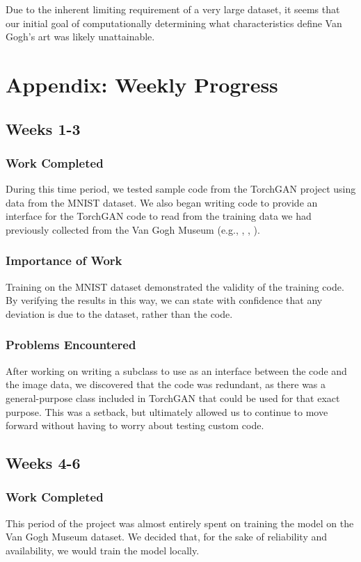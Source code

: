 \documentclass[11pt,letterpaper]{article}
\begin{document}
		Due to the inherent limiting requirement of a very large dataset, it seems that our initial goal of computationally determining what characteristics define Van Gogh's art was likely unattainable.

\appendix
	\section{Appendix: Weekly Progress}
		\subsection{Weeks 1-3}
		\label{subsec:weekly:1-3}
			\subsubsection{Work Completed}
				During this time period, we tested sample code from the TorchGAN\cite{pal2019torchgan} project using data from the MNIST\cite{lecun2010mnist} dataset.
				We also began writing code to provide an interface for the TorchGAN code to read from the training data we had previously collected from the Van Gogh Museum (e.g., \cite{001}, \cite{002}, \cite{003}).
			\subsubsection{Importance of Work}
				Training on the MNIST dataset demonstrated the validity of the training code.
				By verifying the results in this way, we can state with confidence that any deviation is due to the dataset, rather than the code.
			\subsubsection{Problems Encountered}
				After working on writing a subclass to use as an interface between the code and the image data, we discovered that the code was redundant, as there was a general-purpose class included in TorchGAN that could be used for that exact purpose.
				This was a setback, but ultimately allowed us to continue to move forward without having to worry about testing custom code.

		\subsection{Weeks 4-6}
			\subsubsection{Work Completed}
				This period of the project was almost entirely spent on training the model on the Van Gogh Museum dataset.
				We decided that, for the sake of reliability and availability, we would train the model locally.
\end{document}
